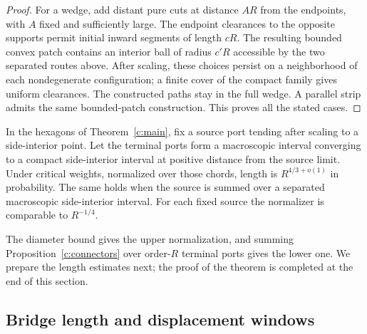 \begin{proof}
For a wedge, add distant pure cuts at distance $AR$ from the endpoints,
with $A$ fixed and sufficiently large. The endpoint clearances to the
opposite supports permit initial inward segments of length $cR$.
The resulting bounded convex patch contains an interior ball of radius
$c'R$ accessible by the two separated routes above. After scaling, these
choices persist on a neighborhood of each nondegenerate configuration;
a finite cover of the compact family gives uniform clearances. The
constructed paths stay in the full wedge. A parallel strip admits the
same bounded-patch construction. This proves all the stated cases.
\end{proof}

\begin{theorem}\label{c:window-law}
In the hexagons of Theorem~\ref{c:main}, fix a source port tending after
scaling to a side-interior point. Let the terminal ports form a
macroscopic interval converging to a compact side-interior interval at
positive distance from the source limit. Under critical weights,
normalized over those chords, length is $R^{4/3+o(1)}$ in probability.
The same holds when the source is summed over a separated macroscopic
side-interior interval. For each fixed source the normalizer is
comparable to $R^{-1/4}$.
\end{theorem}

The diameter bound gives the upper normalization, and summing
Proposition~\ref{c:connectors} over order-$R$ terminal ports gives the
lower one. We prepare the length estimates next; the proof of the theorem
is completed at the end of this section.

\subsection{Bridge length and displacement windows}

